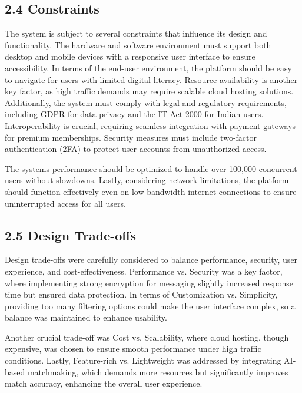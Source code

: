 \subsection{2.4 Constraints}\label{constraints}

The system is subject to several constraints that influence its design
and functionality. The hardware and software environment must support
both desktop and mobile devices with a responsive user interface to
ensure accessibility. In terms of the end-user environment, the platform
should be easy to navigate for users with limited digital literacy.
Resource availability is another key factor, as high traffic demands may
require scalable cloud hosting solutions. Additionally, the system must
comply with legal and regulatory requirements, including GDPR for data
privacy and the IT Act 2000 for Indian users. Interoperability is
crucial, requiring seamless integration with payment gateways for
premium memberships. Security measures must include two-factor
authentication (2FA) to protect user accounts from unauthorized access.

The system\textquotesingle s performance should be optimized to handle
over 100,000 concurrent users without slowdowns. Lastly, considering
network limitations, the platform should function effectively even on
low-bandwidth internet connections to ensure uninterrupted access for
all users.

\subsection{2.5 Design Trade-offs}\label{design-trade-offs}

Design trade-offs were carefully considered to balance performance,
security, user experience, and cost-effectiveness. Performance vs.
Security was a key factor, where implementing strong encryption for
messaging slightly increased response time but ensured data protection.
In terms of Customization vs. Simplicity, providing too many filtering
options could make the user interface complex, so a balance was
maintained to enhance usability.

Another crucial trade-off was Cost vs. Scalability, where cloud hosting,
though expensive, was chosen to ensure smooth performance under high
traffic conditions. Lastly, Feature-rich vs. Lightweight was addressed
by integrating AI-based matchmaking, which demands more resources but
significantly improves match accuracy, enhancing the overall user
experience.

